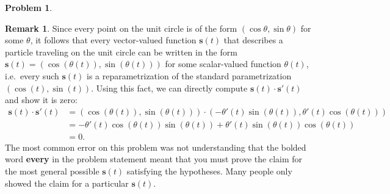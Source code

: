 \documentclass[11pt,oneside]{amsart}
\theoremstyle{definition}
\newtheorem{problem}{Problem}
\newtheorem*{remark}{Remark}
\theoremstyle{plain}
\newcommand{\bs}{{\mathbf{s}}}
\begin{document}
\begin{problem}
\begin{enumerate}[(a)]
\begin{remark}
      Since every point on the unit circle is of the form $(\cos\theta,\sin\theta)$ for some $\theta$, it follows that every vector-valued function $\bs(t)$ that describes a particle traveling on the unit circle can be written in the form $\bs(t)=(\cos(\theta(t)),\sin(\theta(t)))$ for some scalar-valued function $\theta(t)$, i.e.\ every such $\bs(t)$ is a reparametrization of the standard parametrization $(\cos(t),\sin(t))$. Using this fact, we can directly compute $\bs(t)\cdot\bs'(t)$ and show it is zero:
      \[\begin{split}
        \bs(t)\cdot\bs'(t) &= (\cos(\theta(t)),\sin(\theta(t)))\cdot(-\theta'(t)\sin(\theta(t)),\theta'(t)\cos(\theta(t)))\\
        &= -\theta'(t)\cos(\theta(t))\sin(\theta(t))+\theta'(t)\sin(\theta(t))\cos(\theta(t))\\
        &= 0.
      \end{split}\]
      The most common error on this problem was not understanding that the bolded word \textbf{every} in the problem statement meant that you must prove the claim for the most general possible $\bs(t)$ satisfying the hypotheses. Many people only showed the claim for a particular $\bs(t)$.
    \end{remark}
    \vfill
    \vfill
  \end{enumerate}
\end{problem}
\end{document}
